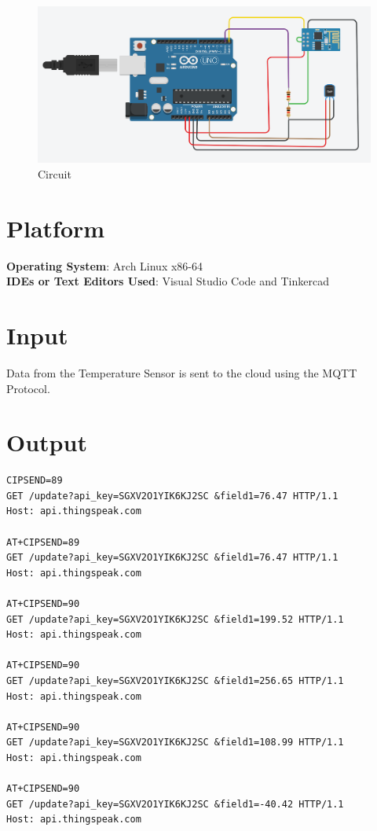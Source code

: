 \documentclass[11pt]{article}
\begin{document}
\begin{figure}[H]
	\centering
	\includegraphics[width=.95\textwidth]{Screenshot_on_2023-05-01_at_15-48-33.png}
	\caption{Circuit}
\end{figure}

\section{Platform}
\textbf{Operating System}: Arch Linux x86-64 \\
\textbf{IDEs or Text Editors Used}: Visual Studio Code and Tinkercad\\

\section{Input}
Data from the Temperature Sensor is sent to the cloud using the MQTT Protocol.
\section{Output}
\begin{verbatim}
CIPSEND=89
GET /update?api_key=SGXV2O1YIK6KJ2SC &field1=76.47 HTTP/1.1
Host: api.thingspeak.com

AT+CIPSEND=89
GET /update?api_key=SGXV2O1YIK6KJ2SC &field1=76.47 HTTP/1.1
Host: api.thingspeak.com

AT+CIPSEND=90
GET /update?api_key=SGXV2O1YIK6KJ2SC &field1=199.52 HTTP/1.1
Host: api.thingspeak.com

AT+CIPSEND=90
GET /update?api_key=SGXV2O1YIK6KJ2SC &field1=256.65 HTTP/1.1
Host: api.thingspeak.com

AT+CIPSEND=90
GET /update?api_key=SGXV2O1YIK6KJ2SC &field1=108.99 HTTP/1.1
Host: api.thingspeak.com

AT+CIPSEND=90
GET /update?api_key=SGXV2O1YIK6KJ2SC &field1=-40.42 HTTP/1.1
Host: api.thingspeak.com
\end{verbatim}
\end{document}
